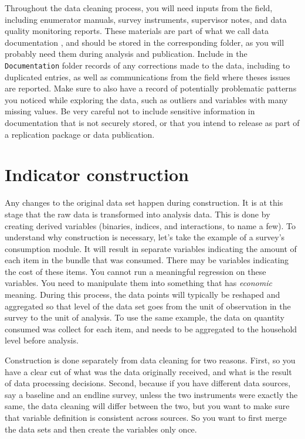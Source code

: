Throughout the data cleaning process, you will need inputs from the field, 
including enumerator manuals, survey instruments, 
supervisor notes, and data quality monitoring reports.
These materials are part of what we call data documentation
,
and should be stored in the corresponding folder, 
as you will probably need them during analysis and publication.
Include in the \texttt{Documentation} folder records of any
corrections made to the data, including to duplicated entries,
as well as communications from the field where theses issues are reported.
Make sure to also have a record of potentially problematic patterns you noticed
while exploring the data, such as outliers and variables with many missing values.
Be very careful not to include sensitive information in 
documentation that is not securely stored, 
or that you intend to release as part of a replication package or data publication.

\section{Indicator construction}

Any changes to the original data set happen during construction.
It is at this stage that the raw data is transformed into analysis data.
This is done by creating derived variables
(binaries, indices, and interactions, to name a few).
To understand why construction is necessary,
let's take the example of a survey's consumption module.
It will result in separate variables indicating the 
amount of each item in the bundle that was consumed.
There may be variables indicating the cost of these items.
You cannot run a meaningful regression on these variables. 
You need to manipulate them into something that has \textit{economic} meaning. 
During this process, the data points will typically be reshaped and aggregated 
so that level of the data set goes from the unit of observation in the survey to the unit of analysis. 
To use the same example, the data on quantity consumed was collect for each item, and needs to be aggregated to the household level before analysis.


Construction is done separately from data cleaning for two reasons. 
First, so you have a clear cut of what was the data originally received,
and what is the result of data processing decisions.
Second, because if you have different data sources, 
say a baseline and an endline survey, 
unless the two instruments were exactly the same, 
the data cleaning will differ between the two,
but you want to make sure that variable definition is consistent across sources. 
So you want to first merge the data sets and then create the variables only once.

